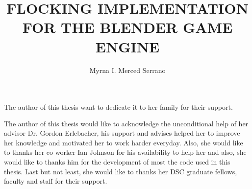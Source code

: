 \documentclass[11pt]{fsuthesis}
\title{FLOCKING IMPLEMENTATION FOR THE BLENDER GAME ENGINE}
\author{Myrna I. Merced Serrano}
\begin{document}
\frontmatter
\maketitle
\makesignaturepage

\begin{dedication}
The author of this thesis want to dedicate it to her family for their support.
\end{dedication}

\begin{acknowledgments}
The author of this thesis would like to acknowledge the unconditional help of her advisor Dr. Gordon Erlebacher, his support and advises helped her to improve her knowledge and motivated her to work harder everyday. Also, she would like to thanks her co-worker Ian Johnson for his availability to help her and also, she would like to thanks him for the development of most the code used in this thesis. Last but not least, she would like to thanks her DSC graduate fellows, faculty and staff for their support.
\end{acknowledgments}

\tableofcontents
\listoftables
\listoffigures





\onehalfspacing

\begin{abstract}
\end{abstract}

\mainmatter


%

\end{document}
